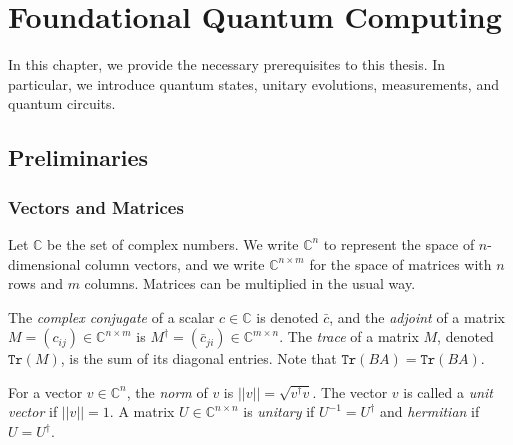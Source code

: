 \documentclass[12pt]{dalthesis}
\begin{document}
\chapter{Foundational Quantum Computing}
\label{foundations}


In this chapter, we provide the necessary prerequisites to this thesis. In particular, we introduce quantum states, unitary evolutions, measurements, and quantum circuits.
\section{Preliminaries}
\subsection{Vectors and Matrices}
Let $\mathbb{C}$ be the set of complex numbers. We write $\mathbb{C}^n$ to represent the space of $n$-dimensional column vectors, and we write $\mathbb{C}^{n \times m}$ for the space of matrices with $n$ rows and $m$ columns. Matrices can be multiplied in the usual way. 

The \emph{complex conjugate} of a scalar $c \in \mathbb{C}$ is denoted $\bar{c}$, and the \emph{adjoint} of a matrix $M = (c_{ij}) \in \mathbb{C}^{n \times m}$ is $M^\dag = (\bar{c}_{ji}) \in \mathbb{C}^{m \times n}$. The \emph{trace} of a matrix $M$, denoted $\texttt{Tr}(M)$, is the sum of its diagonal entries. Note that $\texttt{Tr}(BA) = \texttt{Tr}(BA)$. 

For a vector $v \in \mathbb{C}^n$, the \textit{norm} of $v$ is $||v|| = \sqrt{v^\dag v}$. The vector $v$ is called a \textit{unit vector} if $||v|| = 1$. A matrix $U \in \mathbb{C}^{n \times n}$ is \emph{unitary} if $U^{-1} = U^\dag$ and \emph{hermitian} if  $U = U^\dag$.
\end{document}

